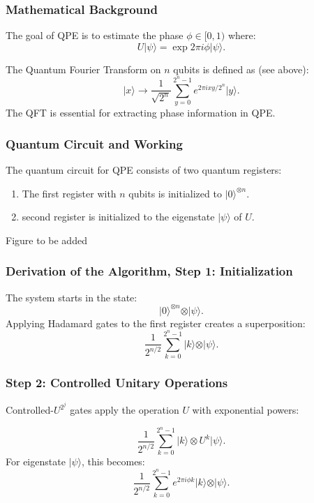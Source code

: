 \documentclass{beamer}
\begin{document}
\begin{frame}
\frametitle{Mathematical Background}

The goal of QPE is to estimate the phase $\phi \in [0,1)$ where:
\[
    U\vert \psi\rangle = \exp{2\pi i \phi} \vert\psi\rangle.
\]

The Quantum Fourier Transform on $n$ qubits is defined as (see above):
\[
    \vert x\rangle \rightarrow \frac{1}{\sqrt{2^n}}\sum_{y=0}^{2^n-1} e^{2\pi i xy / 2^n}\vert y\rangle.
\]
The QFT is essential for extracting phase information in QPE.
\end{frame}

\begin{frame}
\frametitle{Quantum Circuit and Working}

The quantum circuit for QPE consists of two quantum registers:
\begin{enumerate}
\item The first register with $n$ qubits is initialized to $\vert 0\rangle^{\otimes n}$.

\item second register is initialized to the eigenstate $\vert\psi\rangle$ of $U$.
\end{enumerate}

\noindent
Figure to be added
\end{frame}

\begin{frame}
\frametitle{Derivation of the Algorithm, Step 1: Initialization}

\begin{block}{}
The system starts in the state:
\[
\vert 0 \rangle ^{\otimes n} \otimes \vert\psi\rangle .
\]
Applying Hadamard gates to the first register creates a superposition:
\[
    \frac{1}{2^{n/2}}\sum_{k=0}^{2^n -1} \vert k \rangle \otimes \vert\psi\rangle .
\]
\end{block}
\end{frame}

\begin{frame}
\frametitle{Step 2: Controlled Unitary Operations}

Controlled-$U^{2^j}$ gates apply the operation $U$ with exponential powers:
\begin{block}{}
\[
    \frac{1}{2^{n/2}}\sum_{k=0}^{2^n -1} \vert k \rangle  \otimes U^k\vert\psi\rangle .
\]
For eigenstate $\vert\psi\rangle $, this becomes:
\[
    \frac{1}{2^{n/2}}\sum_{k=0}^{2^n -1} e^{2\pi i \phi k}\vert k \rangle  \otimes \vert\psi\rangle .
\]
\end{block}
\end{frame}
\end{document}
